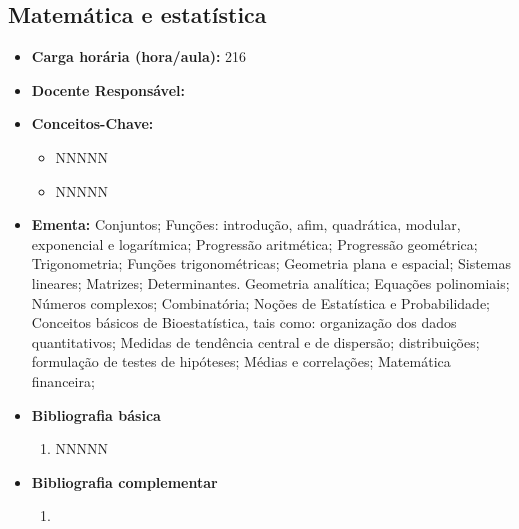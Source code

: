 \documentclass[11pt,fleqn]{book} %
\begin{document}
\subsection{Matemática e estatística}\label{disc:matematica}
\begin{itemize}
	\item \textbf{Carga horária (hora/aula):} 216
	\item \textbf{Docente Responsável:}
	\item \textbf{Conceitos-Chave:}
	\begin{itemize}
		\item NNNNN
		\item NNNNN
	\end{itemize}
	\item \textbf{Ementa:} Conjuntos;
	Funções: introdução, afim, quadrática, modular, exponencial e logarítmica;
	Progressão aritmética;
	Progressão geométrica;
	Trigonometria;
	Funções trigonométricas;
	Geometria plana e espacial;
	Sistemas lineares;
	Matrizes;
	Determinantes.
	Geometria analítica; 
	Equações polinomiais; 
	Números complexos; 
	Combinatória; 
	Noções de Estatística e Probabilidade;
	Conceitos básicos de Bioestatística, tais como: organização dos dados quantitativos;
	Medidas de tendência central e de dispersão; distribuições; formulação de testes de hipóteses; 
	Médias e correlações;
	Matemática financeira;
	\item \textbf{Bibliografia básica}
	\begin{enumerate}
		\item NNNNN
	\end{enumerate}
	\item \textbf{Bibliografia complementar}
	\begin{enumerate}
		\item 
	\end{enumerate}	
\end{itemize}


\newpage
\end{document}
